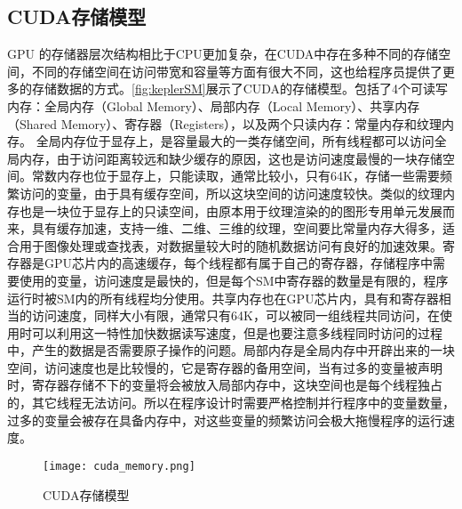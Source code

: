 \subsection{CUDA存储模型}
GPU 的存储器层次结构相比于CPU更加复杂，在CUDA中存在多种不同的存储空间，不同的存储空间在访问带宽和容量等方面有很大不同，这也给程序员提供了更多的存储数据的方式。\autoref{fig:keplerSM}展示了CUDA的存储模型。包括了4个可读写内存：全局内存（Global Memory）、局部内存（Local Memory）、共享内存（Shared Memory）、寄存器（Registers），以及两个只读内存：常量内存和纹理内存。
全局内存位于显存上，是容量最大的一类存储空间，所有线程都可以访问全局内存，由于访问距离较远和缺少缓存的原因，这也是访问速度最慢的一块存储空间。常数内存也位于显存上，只能读取，通常比较小，只有64K，存储一些需要频繁访问的变量，由于具有缓存空间，所以这块空间的访问速度较快。类似的纹理内存也是一块位于显存上的只读空间，由原本用于纹理渲染的的图形专用单元发展而来，具有缓存加速，支持一维、二维、三维的纹理，空间要比常量内存大得多，适合用于图像处理或查找表，对数据量较大时的随机数据访问有良好的加速效果。寄存器是GPU芯片内的高速缓存，每个线程都有属于自己的寄存器，存储程序中需要使用的变量，访问速度是最快的，但是每个SM中寄存器的数量是有限的，程序运行时被SM内的所有线程均分使用。共享内存也在GPU芯片内，具有和寄存器相当的访问速度，同样大小有限，通常只有64K，可以被同一组线程共同访问，在使用时可以利用这一特性加快数据读写速度，但是也要注意多线程同时访问的过程中，产生的数据是否需要原子操作的问题。局部内存是全局内存中开辟出来的一块空间，访问速度也是比较慢的，它是寄存器的备用空间，当有过多的变量被声明时，寄存器存储不下的变量将会被放入局部内存中，这块空间也是每个线程独占的，其它线程无法访问。所以在程序设计时需要严格控制并行程序中的变量数量，过多的变量会被存在具备内存中，对这些变量的频繁访问会极大拖慢程序的运行速度。
\begin{figure}[htbp]
	\centering
	\texttt{[image: cuda\_memory.png]}
	\caption{CUDA存储模型}\label{fig:cuda_memory}
\end{figure}

